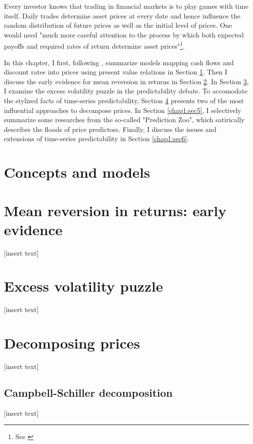 \minitoc

\vspace{0.5cm}
Every investor knows that trading in financial markets is to play
games with time itself. Daily trades determine asset prices at every date and hence
influence the random distribution of future prices as well as the initial
level of prices. One would need "much more careful attention to the process
by which both expected payoffs and required rates of return determine
asset prices"\footnote{See \citet[p.~121]{campbell2017financial}}.

In this chapter, I first, following \citet[Chapter~5]{campbell2017financial}, summarize models 
mapping cash flows and discount rates into prices using present value relations in Section \ref{chap1:sec1}.
Then I discuss the early evidence for mean reversion in returns in Section \ref{chap1:sec2}.
In Section \ref{chap1:sec3}, I examine the excess volatility puzzle in the predictability debate.
To accomodate the stylized facts of time-series predictability, Section \ref{chap1:sec4}
presents two of the most influential approaches to decompose prices. In Section \ref{chap1:sec5},
I selectively summarize some researches from the so-called "Prediction Zoo", which satirically 
describes the floods of price predictors. Finally, I discuss the issues and extensions of time-series
predictability in Section \ref{chap1:sec6}.

\section{Concepts and models}\label{chap1:sec1}


\section{Mean reversion in returns: early evidence}\label{chap1:sec2}
[insert text]

\section{Excess volatility puzzle}\label{chap1:sec3}
[insert text]

\section{Decomposing prices}\label{chap1:sec4}
[insert text]

\subsection{Campbell-Schiller decomposition}\label{chap1:sec4:ssec1}
[insert text]

